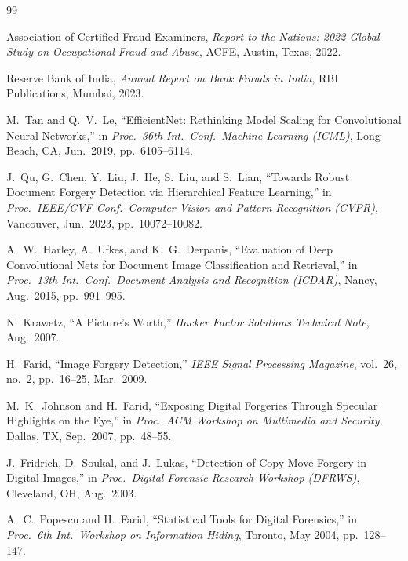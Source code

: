 \documentclass[12pt,a4paper,oneside]{report}
\begin{document}
\newpage
\begin{thebibliography}{99}

Association of Certified Fraud Examiners,
\textit{Report to the Nations: 2022 Global Study on Occupational Fraud and Abuse},
ACFE, Austin, Texas, 2022.

Reserve Bank of India,
\textit{Annual Report on Bank Frauds in India},
RBI Publications, Mumbai, 2023.

M.~Tan and Q.~V.~Le,
``EfficientNet: Rethinking Model Scaling for Convolutional Neural Networks,''
in \textit{Proc.\ 36th Int.\ Conf.\ Machine Learning (ICML)},
Long Beach, CA, Jun.\ 2019, pp.~6105--6114.

J.~Qu, G.~Chen, Y.~Liu, J.~He, S.~Liu, and S.~Lian,
``Towards Robust Document Forgery Detection via Hierarchical Feature Learning,''
in \textit{Proc.\ IEEE/CVF Conf.\ Computer Vision and Pattern Recognition (CVPR)},
Vancouver, Jun.\ 2023, pp.~10072--10082.

A.~W.~Harley, A.~Ufkes, and K.~G.~Derpanis,
``Evaluation of Deep Convolutional Nets for Document Image Classification and Retrieval,''
in \textit{Proc.\ 13th Int.\ Conf.\ Document Analysis and Recognition (ICDAR)},
Nancy, Aug.\ 2015, pp.~991--995.

N.~Krawetz,
``A Picture's Worth,''
\textit{Hacker Factor Solutions Technical Note}, Aug.\ 2007.

H.~Farid,
``Image Forgery Detection,''
\textit{IEEE Signal Processing Magazine},
vol.~26, no.~2, pp.~16--25, Mar.\ 2009.

M.~K.~Johnson and H.~Farid,
``Exposing Digital Forgeries Through Specular Highlights on the Eye,''
in \textit{Proc.\ ACM Workshop on Multimedia and Security},
Dallas, TX, Sep.\ 2007, pp.~48--55.

J.~Fridrich, D.~Soukal, and J.~Lukas,
``Detection of Copy-Move Forgery in Digital Images,''
in \textit{Proc.\ Digital Forensic Research Workshop (DFRWS)},
Cleveland, OH, Aug.\ 2003.

A.~C.~Popescu and H.~Farid,
``Statistical Tools for Digital Forensics,''
in \textit{Proc.\ 6th Int.\ Workshop on Information Hiding},
Toronto, May 2004, pp.~128--147.


\end{thebibliography}
\end{document}
